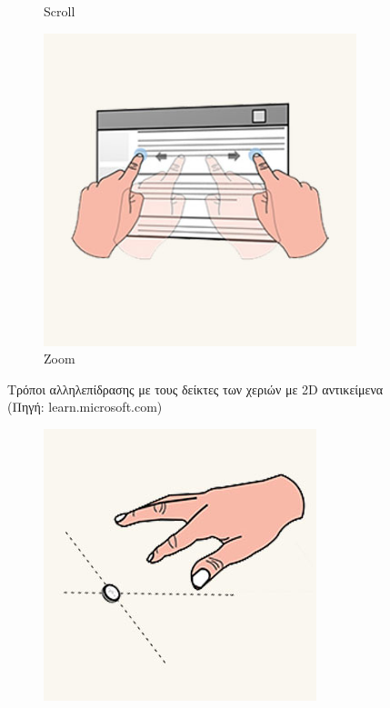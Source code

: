 \begin{enumerate}
\begin{figure}[t]
\begin{subfigure}{0.3\textwidth}
            \caption{Scroll}\label{fig:hololensInteractionScroll}
        \end{subfigure}%
        \begin{subfigure}{0.3\textwidth}
            \centering
            \includegraphics[width=0.9\linewidth]{images/hololens_interaction_zoom.jpg}
            \caption{Zoom}\label{fig:hololensInteractionZoom}
        \end{subfigure}%
        \caption{Τρόποι αλληλεπίδρασης με τους δείκτες των χεριών με 2D αντικείμενα {\footnotesize (Πηγή: learn.microsoft.com)}}\label{fig:hololensInteraction2D}
    \end{figure}
    \begin{figure}[!ht]
        \centering
        \begin{subfigure}{0.25\textwidth}
            \centering
            \includegraphics[width=0.9\linewidth]{images/hololens_interaction_press_step1.jpg}

\end{subfigure}
\end{figure}
\end{enumerate}
